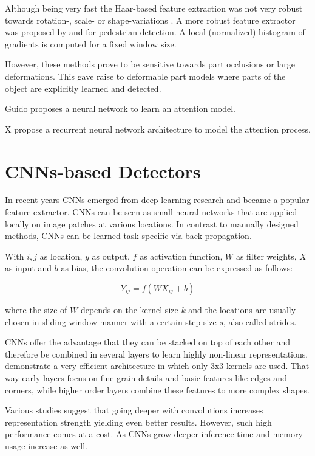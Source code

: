 	Although being very fast the Haar-based feature extraction was not very robust towards rotation-, scale- or shape-variations . A more robust feature extractor was proposed by \cite{Dalal} and \cite{Lowe2004} for pedestrian detection. A local (normalized) histogram of gradients is computed for a fixed window size. 

	However, these methods prove to be sensitive towards part occlusions or large deformations. This gave raise to deformable part models where parts of the object are explicitly learned and detected.  

	
	Guido proposes a neural network to learn an attention model.
	
	X propose a recurrent neural network architecture to model the attention process.
	
	\section{\acp{CNN}-based Detectors}
	
	In recent years \acp{CNN} emerged from deep learning research and became a popular feature extractor. \acp{CNN} can be seen as small neural networks that are applied locally on image patches at various locations. In contrast to manually designed methods, \acp{CNN} can be learned task specific via back-propagation.
	
	With $i,j$ as location, $y$ as output, $f$ as activation function, $W$ as filter weights, $X$ as input and $b$ as bias, the convolution operation can be expressed as follows:
	
	$$Y_{ij} = f(WX_{ij} + b)$$
	
	where the size of $W$ depends on the kernel size $k$ and the locations are usually chosen in sliding window manner with a certain step size $s$, also called strides.
	
	\acp{CNN} offer the advantage that they can be stacked on top of each other and therefore be combined in several layers to learn highly non-linear representations.
	 demonstrate a very efficient architecture in which only 3x3 kernels are used. That way early layers focus on fine grain details and basic features like edges and corners, while higher order layers combine these features to more complex shapes. 
	
	Various studies suggest that going deeper with convolutions increases representation strength yielding even better results. However, such high performance comes at a cost. As \acp{CNN} grow deeper inference time and memory usage increase as well.
	
